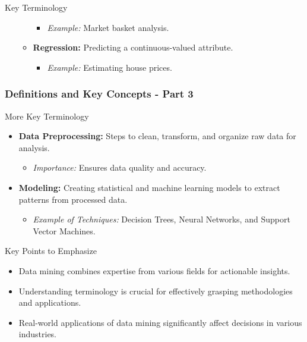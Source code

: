 \documentclass[aspectratio=169]{beamer}
\begin{document}
\begin{frame}[fragile]
\begin{block}{Key Terminology}
\begin{enumerate}
\begin{itemize}
                        \begin{itemize}
                            \item \textit{Example:} Market basket analysis.
                        \end{itemize}
                    \item \textbf{Regression:} Predicting a continuous-valued attribute. 
                        \begin{itemize}
                            \item \textit{Example:} Estimating house prices.
                        \end{itemize}
                \end{itemize}
        \end{enumerate}
    \end{block}
\end{frame}

\begin{frame}[fragile]
    \frametitle{Definitions and Key Concepts - Part 3}
    \begin{block}{More Key Terminology}
        \begin{itemize}
            \item \textbf{Data Preprocessing:} Steps to clean, transform, and organize raw data for analysis.
                \begin{itemize}
                    \item \textit{Importance:} Ensures data quality and accuracy.
                \end{itemize}
            \item \textbf{Modeling:} Creating statistical and machine learning models to extract patterns from processed data.
                \begin{itemize}
                    \item \textit{Example of Techniques:} Decision Trees, Neural Networks, and Support Vector Machines.
                \end{itemize}
        \end{itemize}
    \end{block}

    \begin{block}{Key Points to Emphasize}
        \begin{itemize}
            \item Data mining combines expertise from various fields for actionable insights.
            \item Understanding terminology is crucial for effectively grasping methodologies and applications.
            \item Real-world applications of data mining significantly affect decisions in various industries.
        \end{itemize}
    \end{block}
\end{frame}
\end{document}

